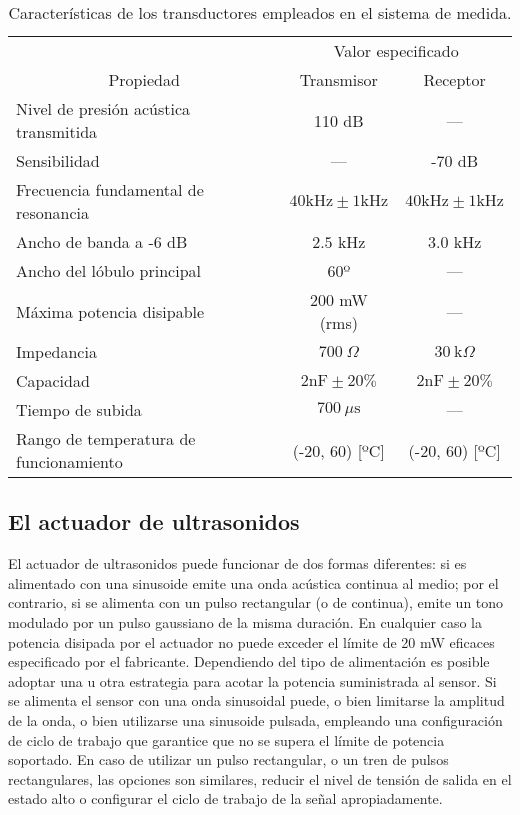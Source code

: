 \begin{sidewaystable}
	\centering
	\begin{threeparttable}
	\begin{tabular}{l c c}
		\toprule
		& \multicolumn{2}{c}{Valor especificado\tnote{*}} \\
		\cmidrule(l){2-3}
		\multicolumn{1}{c}{Propiedad} & Transmisor & Receptor \\
		\midrule
		Nivel de presión acústica transmitida & 110 dB & --- \\
		Sensibilidad & --- & -70 dB \\
		Frecuencia fundamental de resonancia
		& $40 \text{kHz} \pm 1 \text{kHz}$
		& $40 \text{kHz} \pm 1 \text{kHz}$ \\
		Ancho de banda a -6 dB & $2.5$ kHz & $3.0$ kHz \\
		Ancho del lóbulo principal & 60º & --- \\
		Máxima potencia disipable & 200 mW (rms) & --- \\
		Impedancia & $700\ \Omega$ & $30\ \text{k}\Omega$ \\
		Capacidad & $2 \text{nF} \pm 20\%$
		& $2 \text{nF} \pm 20\%$ \\
		Tiempo de subida & $700\ \mu\text{s}$ & --- \\
		Rango de temperatura de funcionamiento %
		& (-20, 60) [ºC] & (-20, 60) [ºC] \\
		\bottomrule
	\end{tabular}
	\begin{TableNotes}
	\end{TableNotes}
	\end{threeparttable}
	\caption[Características de los transductores]{Características de
	los transductores empleados en el sistema de medida.}
	\label{tab:transducers}
\end{sidewaystable}


\subsection{El actuador de ultrasonidos}

El actuador de ultrasonidos puede funcionar de dos formas diferentes: si es
alimentado con una sinusoide emite una onda acústica continua al medio; por
el contrario, si se alimenta con un pulso rectangular (o de continua),
emite un tono modulado por un pulso gaussiano de la misma duración. En
cualquier caso la potencia disipada por el actuador no puede exceder el
límite de 20 mW eficaces especificado por el fabricante. Dependiendo del
tipo de alimentación es posible adoptar una u otra estrategia para acotar
la potencia suministrada al sensor. Si se alimenta el sensor con una onda
sinusoidal puede, o bien limitarse la amplitud de la onda, o bien
utilizarse una sinusoide pulsada, empleando una configuración de ciclo de
trabajo que garantice que no se supera el límite de potencia soportado. En
caso de utilizar un pulso rectangular, o un tren de pulsos rectangulares,
las opciones son similares, reducir el nivel de tensión de salida en el
estado alto o configurar el ciclo de trabajo de la señal apropiadamente.

